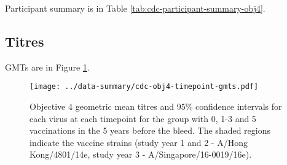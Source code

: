 \documentclass[12pt]{article}
\begin{document}
Participant summary is in Table \ref{tab:cdc-participant-summary-obj4}.



\subsection{Titres}

GMTs are in Figure \ref{fig:cdc-obj4-timepoint-gmts}.

\begin{figure}
	\texttt{[image: ../data-summary/cdc-obj4-timepoint-gmts.pdf]}
	\caption{Objective 4 geometric mean titres and 95\% confidence intervals for each virus at each timepoint for the group with 0, 1-3 and 5 vaccinations in the 5 years before the bleed. The shaded regions indicate the vaccine strains (study year 1 and 2 - A/Hong Kong/4801/14e, study year 3 - A/Singapore/16-0019/16e).}
	\label{fig:cdc-obj4-timepoint-gmts}
\end{figure}
\end{document}
